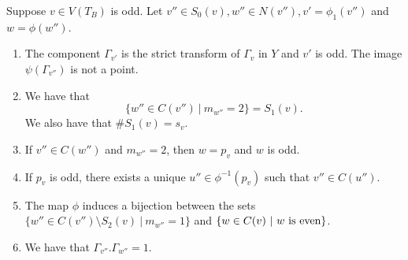 \begin{lemma}\label{oddprelim}
Suppose $v \in V(T_B)$ is odd. Let $v'' \in S_0(v), w'' \in N(v''),v' = \phi_1(v'')$ and $w = \phi(w'')$. 
 \begin{enumerate}[\upshape (a)]
  \item The component $\Gamma_{v'}$ is the strict transform of $\Gamma_v$ in $Y$ and $v'$ is odd. The image $\psi(\Gamma_{v''})$ is not a point.
  \item We have that
  \[ \{ w'' \in C(v'') \ | \ m_{w''} = 2 \} = S_1(v) .\] 
  We also have that $\# S_1(v) = s_v$.
  \item If $v'' \in C(w'')$ and $m_{w''} = 2$, then $w = p_v$ and $w$ is odd.
  \item If $p_v$ is odd, there exists a unique $u'' \in \phi^{-1}(p_v)$ such that $v'' \in C(u'')$.
  \item The map $\phi$ induces a bijection between the sets $\{ w'' \in C(v'') \setminus S_2(v)\ |\ m_{w''} = 1 \}$ and $\{ w \in C(v)\ | \ w \ \textup{is even} \}$.
  \item We have that $\Gamma_{v''}.\Gamma_{w''} = 1$.
 \end{enumerate}
\end{lemma}
